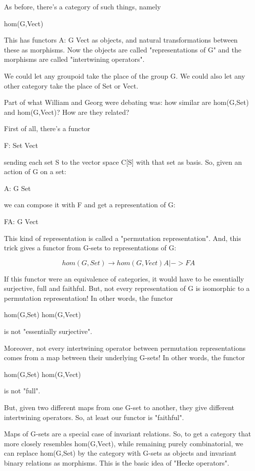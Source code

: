 As before, there's a category of such things, namely

hom(G,Vect)

This has functors A: G \to  Vect as objects, and natural transformations
between these as morphisms.  Now the objects are called "representations 
of G" and the morphisms are called "intertwining operators".

We could let any groupoid take the place of the group G.  We could also
let any other category take the place of Set or Vect.  

Part of what William and Georg were debating was: how similar are 
hom(G,Set) and hom(G,Vect)?  How are they related? 

First of all, there's a functor 

F: Set \to  Vect

sending each set S to the vector space C[S] with that set as basis.  So,
given an action of G on a set:

A: G \to  Set

we can compose it with F and get a representation of G:

FA: G \to  Vect

This kind of representation is called a "permutation representation".
And, this trick gives a functor from G-sets to representations of G:


$$

hom(G,Set) \to  hom(G,Vect) 
        A |-> FA
$$
    
If this functor were an equivalence of categories, it would have to
be essentially surjective, full and faithful.
But, not every representation of G is isomorphic to a permutation
representation!  In other words, the functor 

hom(G,Set) \to  hom(G,Vect) 

is not "essentially surjective".  

Moreover, not every intertwining operator between permutation 
representations comes from a map between their underlying G-sets!
In other words, the functor

hom(G,Set) \to  hom(G,Vect) 

is not "full".  

But, given two different maps from one G-set to another, they give 
different intertwining operators.  So, at least our functor is "faithful".  

Maps of G-sets are a special case of invariant relations.  So, to get a 
category that more closely resembles hom(G,Vect), while remaining purely 
combinatorial, we can replace hom(G,Set) by the category with G-sets as 
objects and invariant binary relations as morphisms.  This is the basic 
idea of "Hecke operators".  

